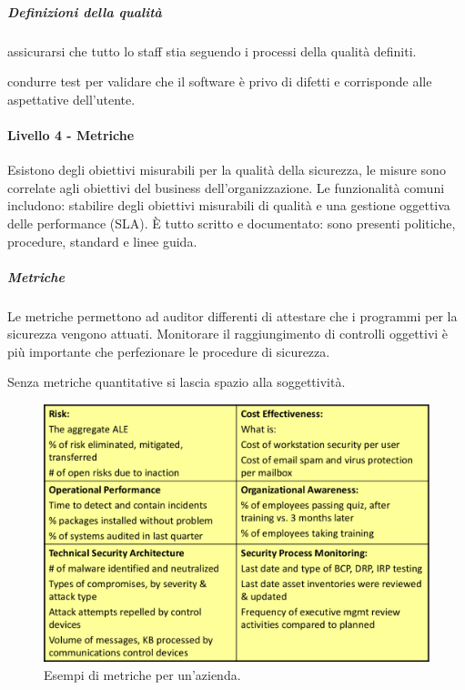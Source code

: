 \subparagraph{Definizioni della qualità}

 assicurarsi che tutto lo staff stia seguendo i 
processi della qualità definiti.

 condurre test per validare che il software è 
privo di difetti e corrisponde alle aspettative dell'utente.

\paragraph{Livello 4 - Metriche}

Esistono degli obiettivi misurabili per la qualità della sicurezza, le misure 
sono correlate agli obiettivi del business dell'organizzazione. Le funzionalità 
comuni includono: stabilire degli obiettivi misurabili di qualità e una gestione
oggettiva delle performance (SLA).
È tutto scritto e documentato: sono presenti politiche, 
procedure, standard e linee guida.

\subparagraph{Metriche}

Le metriche permettono ad auditor differenti di attestare che i programmi per 
la sicurezza vengono attuati. Monitorare il raggiungimento di controlli oggettivi 
è più importante che perfezionare le procedure di sicurezza.

Senza metriche quantitative si lascia spazio alla soggettività.

\begin{figure}[h!]
        \begin{center}
                \includegraphics[scale=1.5]{res/img/metriche}
        \end{center}
        \caption{Esempi di metriche per un'azienda.}    
\end{figure}

